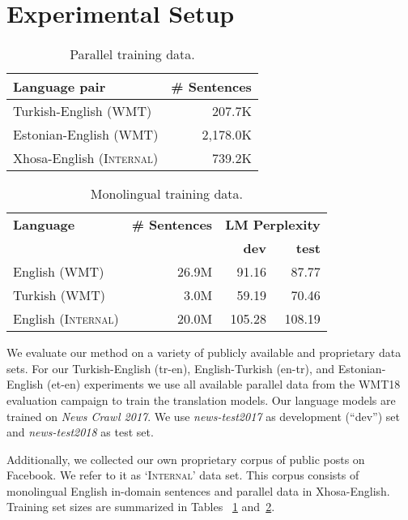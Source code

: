 \documentclass[11pt,a4paper]{article}
\begin{document}
\section{Experimental Setup}

\begin{table}[t!]
\centering
\small
\begin{tabular}{|l|r|}
\hline
 {\bf Language pair} & {\bf \# Sentences} \\\hline
 Turkish-English (\textsc{WMT}) & 207.7K \\
 Estonian-English (\textsc{WMT}) & 2,178.0K \\
 Xhosa-English (\textsc{Internal}) & 739.2K \\
\hline
\end{tabular}
\caption{Parallel training data.}\label{tab:parallel}
\end{table}


\begin{table}[t!]
\centering
\small
\begin{tabular}{|l|r|r|r|}
\hline
 {\bf Language} & {\bf \# Sentences} & \multicolumn{2}{c|}{{\bf LM Perplexity}} \\
  &  & {\bf dev} & {\bf test} \\\hline
English (\textsc{WMT}) & 26.9M & 91.16 & 87.77  \\
Turkish (\textsc{WMT}) & 3.0M & 59.19 & 70.46  \\
English (\textsc{Internal}) & 20.0M & 105.28 & 108.19 \\
\hline
\end{tabular}
\caption{Monolingual training data.}\label{tab:lm}
\end{table}


We evaluate our method on a variety of publicly available and proprietary data sets. For our Turkish-English (tr-en), English-Turkish (en-tr), and Estonian-English (et-en) experiments we use all available parallel data from the WMT18 evaluation campaign to train the translation models. Our language models are trained on {\em News Crawl 2017}. 
We use {\em news-test2017} as development (``dev'') set and {\em news-test2018} as test set.

Additionally, we collected our own proprietary corpus of public posts on Facebook. We refer to it as `\textsc{Internal}' data set. This corpus consists of monolingual English in-domain sentences and parallel data in Xhosa-English. Training set sizes are summarized in Tables ~\ref{tab:parallel} and~\ref{tab:lm}.
\end{document}
